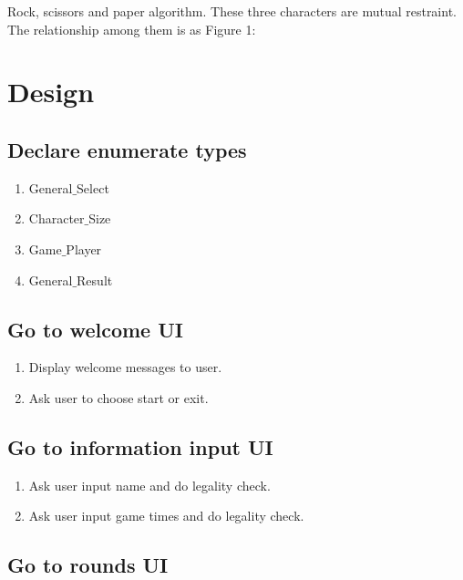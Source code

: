 \documentclass[12pt]{article}
\begin{document}
	Rock, scissors and paper algorithm. These three characters are mutual restraint. The relationship among them is as Figure 1:
	
	
	
	\section{Design}
	
	\subsection{Declare enumerate types}
		
		\begin{enumerate}
			\item General$\_$Select
			\item Character$\_$Size
			\item Game$\_$Player
			\item General$\_$Result
		\end{enumerate}
	
	\subsection{Go to welcome UI}
		
		\begin{enumerate}
			\item Display welcome messages to user.
			\item Ask user to choose start or exit.
		\end{enumerate}
		
	\subsection{Go to information input UI}
		
		\begin{enumerate}
			\item Ask user input name and do legality check.
			\item Ask user input game times and do legality check.
		\end{enumerate}
		
	\subsection{Go to rounds UI}
		
\end{document}
